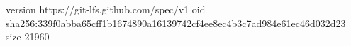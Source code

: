 version https://git-lfs.github.com/spec/v1
oid sha256:339f0abba65cff1b1674890a16139742cf4ee8ec4b3c7ad984e61ec46d032d23
size 21960
